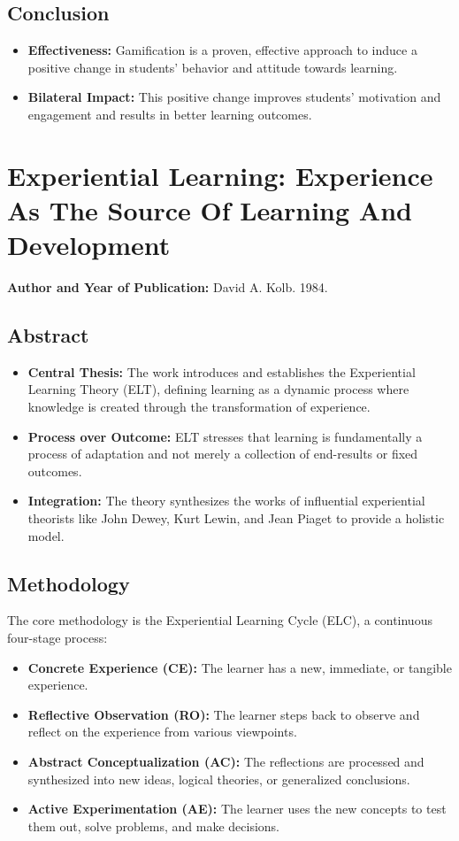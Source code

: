 \documentclass[12pt,a4paper]{report}
\begin{document}
\subsection{Conclusion}
\begin{itemize}
  \item \textbf{Effectiveness:} Gamification is a proven, effective approach to induce a positive change in students' behavior and attitude towards learning.
  \item \textbf{Bilateral Impact:} This positive change improves students' motivation and engagement and results in better learning outcomes.
\end{itemize}

\section{Experiential Learning: Experience As The Source Of Learning And Development}
\textbf{Author and Year of Publication:} David A. Kolb. 1984.

\subsection{Abstract}
\begin{itemize}
  \item \textbf{Central Thesis:} The work introduces and establishes the Experiential Learning Theory (ELT), defining learning as a dynamic process where knowledge is created through the transformation of experience.
  \item \textbf{Process over Outcome:} ELT stresses that learning is fundamentally a process of adaptation and not merely a collection of end-results or fixed outcomes.
  \item \textbf{Integration:} The theory synthesizes the works of influential experiential theorists like John Dewey, Kurt Lewin, and Jean Piaget to provide a holistic model.
\end{itemize}

\subsection{Methodology}
The core methodology is the Experiential Learning Cycle (ELC), a continuous four-stage process:
\begin{itemize}
  \item \textbf{Concrete Experience (CE):} The learner has a new, immediate, or tangible experience.
  \item \textbf{Reflective Observation (RO):} The learner steps back to observe and reflect on the experience from various viewpoints.
  \item \textbf{Abstract Conceptualization (AC):} The reflections are processed and synthesized into new ideas, logical theories, or generalized conclusions.
  \item \textbf{Active Experimentation (AE):} The learner uses the new concepts to test them out, solve problems, and make decisions.
\end{itemize}
\end{document}
